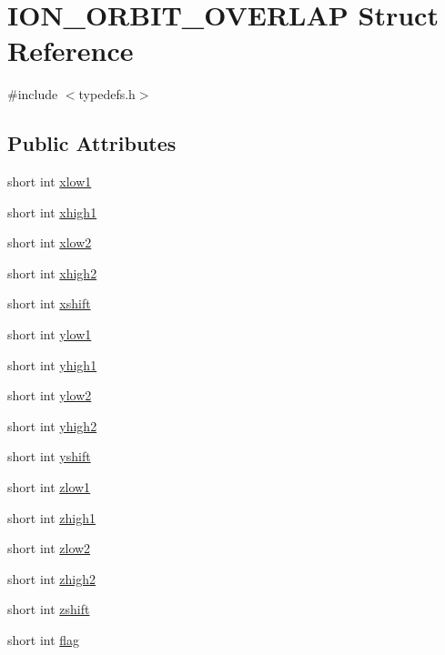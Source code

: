 \hypertarget{struct_i_o_n___o_r_b_i_t___o_v_e_r_l_a_p}{\section{I\-O\-N\-\_\-\-O\-R\-B\-I\-T\-\_\-\-O\-V\-E\-R\-L\-A\-P Struct Reference}
\label{struct_i_o_n___o_r_b_i_t___o_v_e_r_l_a_p}
}


{\ttfamily \#include $<$typedefs.\-h$>$}

\subsection*{Public Attributes}
\begin{DoxyCompactItemize}
\item 
short int \hyperlink{struct_i_o_n___o_r_b_i_t___o_v_e_r_l_a_p_a3fbd565e38c9fb76b12541af3a1b24c1}{xlow1}
\item 
short int \hyperlink{struct_i_o_n___o_r_b_i_t___o_v_e_r_l_a_p_a9f43ba327418568134b51a8e0db18c15}{xhigh1}
\item 
short int \hyperlink{struct_i_o_n___o_r_b_i_t___o_v_e_r_l_a_p_a87a93aa8be866057a518be8261972ed9}{xlow2}
\item 
short int \hyperlink{struct_i_o_n___o_r_b_i_t___o_v_e_r_l_a_p_ad8b86c4d841b14ae663c4d2be3410339}{xhigh2}
\item 
short int \hyperlink{struct_i_o_n___o_r_b_i_t___o_v_e_r_l_a_p_a64cb09e3c86f5065ab924b116e23d5ee}{xshift}
\item 
short int \hyperlink{struct_i_o_n___o_r_b_i_t___o_v_e_r_l_a_p_ad10dfe1c1e4059066d21c09874a04edc}{ylow1}
\item 
short int \hyperlink{struct_i_o_n___o_r_b_i_t___o_v_e_r_l_a_p_ad147d33ca67b4d6793165976795ec4a5}{yhigh1}
\item 
short int \hyperlink{struct_i_o_n___o_r_b_i_t___o_v_e_r_l_a_p_ab42bccb3a255f2267440a726c81a27bb}{ylow2}
\item 
short int \hyperlink{struct_i_o_n___o_r_b_i_t___o_v_e_r_l_a_p_a65984820cb5ce7dcbb21aa9c3881661e}{yhigh2}
\item 
short int \hyperlink{struct_i_o_n___o_r_b_i_t___o_v_e_r_l_a_p_a2f119857d58a92b7aef0a54c4c33ee0f}{yshift}
\item 
short int \hyperlink{struct_i_o_n___o_r_b_i_t___o_v_e_r_l_a_p_a278715cccdb0cc27520f10dad00d659e}{zlow1}
\item 
short int \hyperlink{struct_i_o_n___o_r_b_i_t___o_v_e_r_l_a_p_af5125ca6f6b0c64ade9995589bff6a15}{zhigh1}
\item 
short int \hyperlink{struct_i_o_n___o_r_b_i_t___o_v_e_r_l_a_p_ad04c6c180fdf5b11407f864509db4bb7}{zlow2}
\item 
short int \hyperlink{struct_i_o_n___o_r_b_i_t___o_v_e_r_l_a_p_a820dd67e7685566a10c707f8d5f7bd20}{zhigh2}
\item 
short int \hyperlink{struct_i_o_n___o_r_b_i_t___o_v_e_r_l_a_p_ae24836e3acfab13c4804a8fd5abd6da0}{zshift}
\item 
short int \hyperlink{struct_i_o_n___o_r_b_i_t___o_v_e_r_l_a_p_ad84f0a43a3beda95d1a232681b8255dc}{flag}
\end{DoxyCompactItemize}


